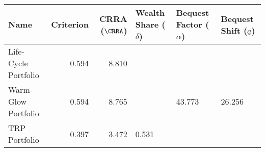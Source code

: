 \begin{tabular}{lrrlll}
    \toprule
    Name                 & Criterion & CRRA ($\CRRA$) & Wealth Share ($\delta$) & Bequest Factor ($\alpha$) & Bequest Shift ($\underline{a}$) \\
    \midrule
    Life-Cycle Portfolio & 0.594     & 8.810          &                         &                           &                                 \\
    Warm-Glow Portfolio  & 0.594     & 8.765          &                         & 43.773                    & 26.256                          \\
    TRP Portfolio        & 0.397     & 3.472          & 0.531                   &                           &                                 \\
    \bottomrule
\end{tabular}
